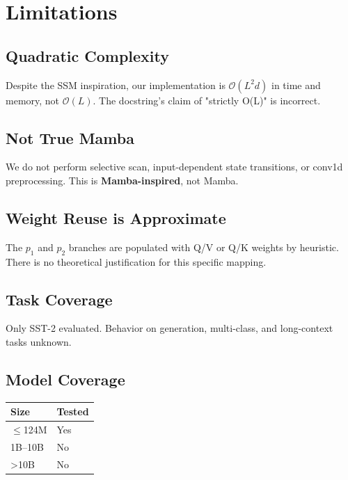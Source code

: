 \section{Limitations}

\subsection{Quadratic Complexity}

Despite the SSM inspiration, our implementation is \textbf{$\mathcal{O}(L^2 d)$} in 
time and memory, not $\mathcal{O}(L)$. The docstring's claim of "strictly 
O(L)" is incorrect.

\subsection{Not True Mamba}

We do not perform selective scan, input-dependent state transitions, or 
conv1d preprocessing. This is \textbf{Mamba-inspired}, not Mamba.

\subsection{Weight Reuse is Approximate}

The $p_1$ and $p_2$ branches are populated with Q/V or Q/K weights by 
heuristic. There is no theoretical justification for this specific mapping.

\subsection{Task Coverage}

Only SST-2 evaluated. Behavior on generation, multi-class, and long-context 
tasks unknown.

\subsection{Model Coverage}

\begin{table}[H]
\centering
\small
\begin{tabular}{ll}
\toprule
\textbf{Size} & \textbf{Tested} \\
\midrule
$\le$124M & Yes \\
1B--10B & No \\
>10B & No \\
\bottomrule
\end{tabular}
\end{table}

